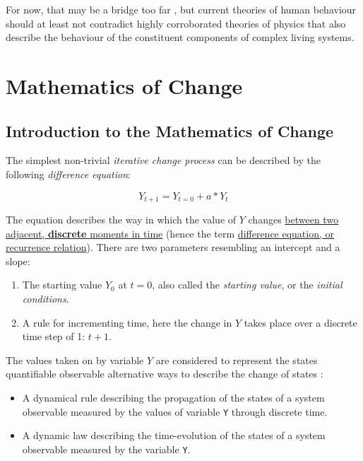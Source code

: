 \documentclass[12pt,]{book}
\providecommand{\tightlist}{%
  \setlength{\itemsep}{0pt}\setlength{\parskip}{0pt}}
\begin{document}
For now, that may be a bridge too far \citep[however, see][]{turvey2012a}, but current theories of human behaviour should at least not contradict highly corroborated theories of physics that also describe the behaviour of the constituent components of complex living systems.

\hypertarget{part-mathematics-of-change}{%
\part{Mathematics of Change}\label{part-mathematics-of-change}}

\hypertarget{introduction-to-the-mathematics-of-change}{%
\chapter{\texorpdfstring{\textbf{Introduction to the Mathematics of Change}}{Introduction to the Mathematics of Change}}\label{introduction-to-the-mathematics-of-change}}

The simplest non-trivial \emph{iterative change process} can be described by the following \emph{difference equation}:

\[ Y_{t+1} = Y_{t=0} + a*Y_t \]

The equation describes the way in which the value of \(Y\) changes \href{https://en.wikipedia.org/wiki/Discrete_time_and_continuous_time}{between two adjacent, \textbf{discrete} moments in time}
(hence the term \href{https://en.wikipedia.org/wiki/Recurrence_relation}{difference equation, or recurrence relation}). There are two parameters resembling an intercept and a slope:

\begin{enumerate}
\def\labelenumi{\arabic{enumi}.}
\tightlist
\item
  The starting value \(Y_0\) at \(t=0\), also called the \emph{starting value}, or the \emph{initial conditions}.
\item
  A rule for incrementing time, here the change in \(Y\) takes place over a discrete time step of 1: \(t+1\).
\end{enumerate}

The values taken on by variable \(Y\) are considered to represent the states quantifiable observable alternative ways to describe the change of states :

\begin{itemize}
\tightlist
\item
  A dynamical rule describing the propagation of the states of a system observable measured by the values of variable \texttt{Y} through discrete time.
\item
  A dynamic law describing the time-evolution of the states of a system observable measured by the variable \texttt{Y}.
\end{itemize}
\end{document}
